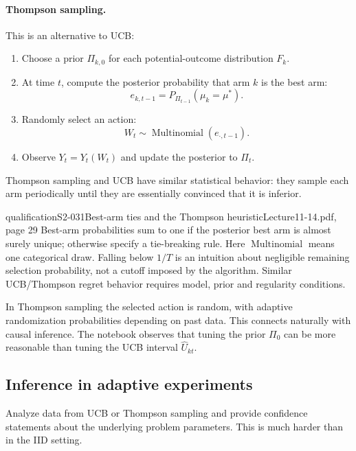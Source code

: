 \paragraph{Thompson sampling.}
This is an alternative to UCB: 
\begin{enumerate}
 \item Choose a prior $\Pi_{k,0}$ for each potential-outcome distribution $F_k$.
 \item At time $t$, compute the posterior probability that arm $k$ is the best arm:
 \[e_{k,t-1}=P_{\Pi_{t-1}}(\mu_k=\mu^*).\]
 \item Randomly select an action:
 \[W_t\sim\operatorname{Multinomial}(e_{\cdot,t-1}).\]
 \item Observe $Y_t=Y_t(W_t)$ and update the posterior to $\Pi_t$.
\end{enumerate}
Thompson sampling and UCB have similar statistical behavior: they sample each arm periodically until they are essentially convinced that it is inferior. 

\begin{reviewnote}{qualification}{S2-031}{Best-arm ties and the Thompson heuristic}{Lecture11-14.pdf, page 29}
Best-arm probabilities sum to one if the posterior best arm is almost surely unique; otherwise specify a tie-breaking rule. Here $\operatorname{Multinomial}$ means one categorical draw. Falling below $1/T$ is an intuition about negligible remaining selection probability, not a cutoff imposed by the algorithm. Similar UCB/Thompson regret behavior requires model, prior and regularity conditions.
\end{reviewnote}


In Thompson sampling the selected action is random, with adaptive randomization probabilities depending on past data. This connects naturally with causal inference.
 The notebook observes that tuning the prior $\Pi_0$ can be more reasonable than tuning the UCB interval $\widehat U_{kt}$.

\subsection{Inference in adaptive experiments}
Analyze data from UCB or Thompson sampling and provide confidence statements about the underlying problem parameters. This is much harder than in the IID setting.


